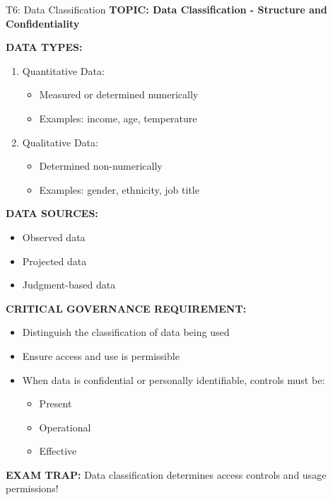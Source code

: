 \documentclass[8pt]{beamer}
\begin{document}
	
	\begin{frame}{T6: Data Classification}
		\fontsize{6.5}{7.5}\selectfont
		\textbf{TOPIC: Data Classification - Structure and Confidentiality}
		
		\vspace{0.1cm}
		\textbf{DATA TYPES:}
		\begin{enumerate}
			\item \textcolor{myblue}{Quantitative Data:}
			\begin{itemize}
				\item Measured or determined numerically
				\item Examples: income, age, temperature
			\end{itemize}
			\item \textcolor{myblue}{Qualitative Data:}
			\begin{itemize}
				\item Determined non-numerically
				\item Examples: gender, ethnicity, job title
			\end{itemize}
		\end{enumerate}
		
		\vspace{0.1cm}
		\textbf{DATA SOURCES:}
		\begin{itemize}
			\item Observed data
			\item Projected data
			\item Judgment-based data
		\end{itemize}
		
		\vspace{0.1cm}
		\textbf{CRITICAL GOVERNANCE REQUIREMENT:}
		\begin{itemize}
			\item Distinguish the classification of data being used
			\item Ensure access and use is permissible
			\item When data is confidential or personally identifiable, controls must be:
			\begin{itemize}
				\item Present
				\item Operational
				\item Effective
			\end{itemize}
		\end{itemize}
		
		\textcolor{myred}{\textbf{EXAM TRAP:}} Data classification determines \textcolor{myblue}{access controls and usage permissions}!
	\end{frame}
	
\end{document}
